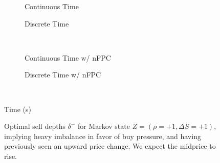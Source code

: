 \begin{figure}%
\centering%
\begin{subfigure}[b]{.4\linewidth}%
  \setlength\figureheight{\linewidth}%
  \setlength\figurewidth{\linewidth}%
  \caption{Continuous Time}%
\end{subfigure}%
\hspace{1.5cm}%
\begin{subfigure}[b]{.4\linewidth}%
  \setlength\figureheight{\linewidth}%
  \setlength\figurewidth{\linewidth}%
  \caption{Discrete Time}%
\end{subfigure}\\%
\vspace{1cm}%
\begin{subfigure}[b]{.4\linewidth}%
  \setlength\figureheight{\linewidth}%
  \setlength\figurewidth{\linewidth}%
  \caption{Continuous Time w/ nFPC}%
\end{subfigure}%
\hspace{1.5cm}%
\begin{subfigure}[b]{.4\linewidth}%
  \setlength\figureheight{\linewidth}%
  \setlength\figurewidth{\linewidth}%
  \caption{Discrete Time w/ nFPC}%
\end{subfigure}\\%
%
\leavevmode{}\hspace{0pt plus 1filll}\null%

Time (s)

\vspace{1cm}%
\begin{subfigure}{\linewidth}%
  \centering%
\end{subfigure}%
  \caption[Optimal sell LO depths for buy pressure imbalance]{Optimal sell depths $\delta^{-}$ for Markov state $Z=(\rho = +1, \Delta S = +1)$, implying heavy imbalance in favor of buy pressure, and having previously seen an upward price change. We expect the midprice to rise.}\label{fig:comp_dm_z15}%
\end{figure}
\FloatBarrier
